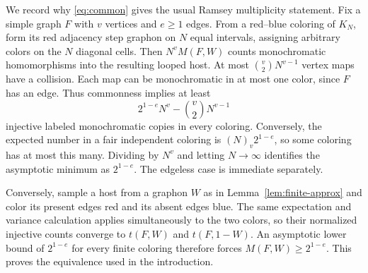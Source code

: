 \documentclass[11pt,a4paper]{article}
\theoremstyle{remark}
\numberwithin{equation}{section}
\begin{document}
We record why \eqref{eq:common} gives the usual Ramsey
multiplicity statement. Fix a simple graph $F$ with $v$ vertices
and $e\geq1$ edges. From a red--blue coloring of $K_N$, form its
red adjacency step graphon on $N$ equal intervals, assigning
arbitrary colors on the $N$ diagonal cells. Then $N^vM(F,W)$
counts monochromatic homomorphisms into the resulting looped
host. At most $\binom v2N^{v-1}$ vertex maps have a collision.
Each map can be monochromatic in at most one color, since $F$
has an edge. Thus commonness implies at least
\[
 2^{1-e}N^v-\binom v2N^{v-1}
\]
injective labeled monochromatic copies in every coloring.
Conversely, the expected number in a fair independent coloring is
$(N)_v2^{1-e}$, so some coloring has at most this many. Dividing
by $N^v$ and letting $N\to\infty$ identifies the asymptotic
minimum as $2^{1-e}$. The edgeless case is immediate separately.

Conversely, sample a host from a graphon $W$ as in
Lemma~\ref{lem:finite-approx} and color its present edges red and
its absent edges blue. The same expectation and variance calculation
applies simultaneously to the two colors, so their normalized
injective counts converge to $t(F,W)$ and $t(F,1-W)$.
An asymptotic lower bound of $2^{1-e}$ for every finite coloring
therefore forces $M(F,W)\geq2^{1-e}$. This proves the equivalence
used in the introduction.



\end{document}
